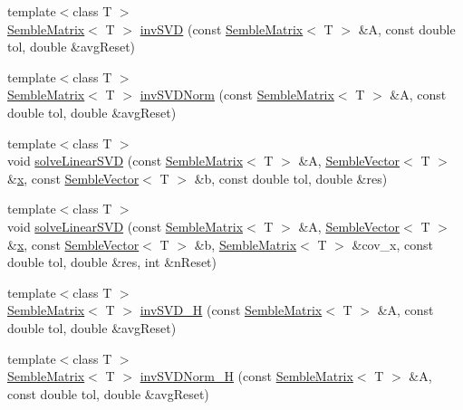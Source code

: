 \begin{DoxyCompactItemize}
\item 
{\footnotesize template$<$class T $>$ }\\\mbox{\hyperlink{structSEMBLE_1_1SembleMatrix}{Semble\+Matrix}}$<$ T $>$ \mbox{\hyperlink{namespaceSEMBLE_adf8aee09f619bd4b2d88858a50ed5eee}{inv\+S\+VD}} (const \mbox{\hyperlink{structSEMBLE_1_1SembleMatrix}{Semble\+Matrix}}$<$ T $>$ \&A, const double tol, double \&avg\+Reset)
\item 
{\footnotesize template$<$class T $>$ }\\\mbox{\hyperlink{structSEMBLE_1_1SembleMatrix}{Semble\+Matrix}}$<$ T $>$ \mbox{\hyperlink{namespaceSEMBLE_a659cbbc5cfef77a1dcf4dbbeb8edab57}{inv\+S\+V\+D\+Norm}} (const \mbox{\hyperlink{structSEMBLE_1_1SembleMatrix}{Semble\+Matrix}}$<$ T $>$ \&A, const double tol, double \&avg\+Reset)
\item 
{\footnotesize template$<$class T $>$ }\\void \mbox{\hyperlink{namespaceSEMBLE_adc86a1c9bd57aeb64bdc1ff2aebe41c4}{solve\+Linear\+S\+VD}} (const \mbox{\hyperlink{structSEMBLE_1_1SembleMatrix}{Semble\+Matrix}}$<$ T $>$ \&A, \mbox{\hyperlink{structSEMBLE_1_1SembleVector}{Semble\+Vector}}$<$ T $>$ \&\mbox{\hyperlink{old__edb_8cc_a63584b830e7aaacb521b11b72291a4bc}{x}}, const \mbox{\hyperlink{structSEMBLE_1_1SembleVector}{Semble\+Vector}}$<$ T $>$ \&b, const double tol, double \&res)
\item 
{\footnotesize template$<$class T $>$ }\\void \mbox{\hyperlink{namespaceSEMBLE_ac312bc4ecb1ed4d73ae750e82fd799c1}{solve\+Linear\+S\+VD}} (const \mbox{\hyperlink{structSEMBLE_1_1SembleMatrix}{Semble\+Matrix}}$<$ T $>$ \&A, \mbox{\hyperlink{structSEMBLE_1_1SembleVector}{Semble\+Vector}}$<$ T $>$ \&\mbox{\hyperlink{old__edb_8cc_a63584b830e7aaacb521b11b72291a4bc}{x}}, const \mbox{\hyperlink{structSEMBLE_1_1SembleVector}{Semble\+Vector}}$<$ T $>$ \&b, \mbox{\hyperlink{structSEMBLE_1_1SembleMatrix}{Semble\+Matrix}}$<$ T $>$ \&cov\+\_\+x, const double tol, double \&res, int \&n\+Reset)
\item 
{\footnotesize template$<$class T $>$ }\\\mbox{\hyperlink{structSEMBLE_1_1SembleMatrix}{Semble\+Matrix}}$<$ T $>$ \mbox{\hyperlink{namespaceSEMBLE_a752dade1ba0b0662d55c17cfdc66cddc}{inv\+S\+V\+D\+\_\+H}} (const \mbox{\hyperlink{structSEMBLE_1_1SembleMatrix}{Semble\+Matrix}}$<$ T $>$ \&A, const double tol, double \&avg\+Reset)
\item 
{\footnotesize template$<$class T $>$ }\\\mbox{\hyperlink{structSEMBLE_1_1SembleMatrix}{Semble\+Matrix}}$<$ T $>$ \mbox{\hyperlink{namespaceSEMBLE_a952949666873f95d18fdb968c4453f3b}{inv\+S\+V\+D\+Norm\+\_\+H}} (const \mbox{\hyperlink{structSEMBLE_1_1SembleMatrix}{Semble\+Matrix}}$<$ T $>$ \&A, const double tol, double \&avg\+Reset)

\end{DoxyCompactItemize}

